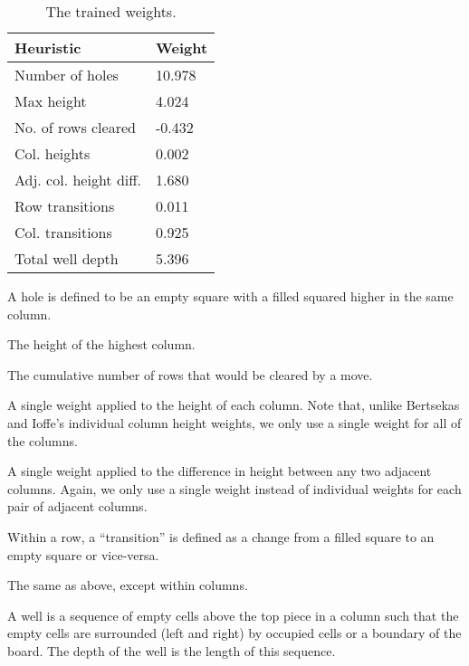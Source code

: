 \documentclass[12pt, twocolumn]{article}
\begin{document}
\begin{table}
\centering
\begin{tabular}{ l l }
\toprule
Heuristic & Weight \\
\midrule
Number of holes & 10.978 \\
Max height & 4.024 \\ 
No. of rows cleared & -0.432 \\
Col. heights & 0.002 \\ 
Adj. col. height diff. & 1.680 \\ 
Row transitions & 0.011 \\ 
Col. transitions & 0.925 \\ 
Total well depth & 5.396 \\  
\bottomrule
\end{tabular}
\caption{The trained weights.}
\label{tbl:heu}
\end{table}

\begin{description}[leftmargin=0.5cm]
	\item[Number of holes.]
	A hole is defined to be an empty square with a filled
	squared higher in the same column.\footnotemark[1]
    
    \item[Maximum height.]
	The height of the highest column.\footnotemark[1]
    
    \item[Rows cleared.]
	The cumulative number of rows that would be cleared by a move.\footnotemark[2]
    
    \item[Column heights.]
	A single weight applied to the height of each column. 
    Note that, unlike Bertsekas and Ioffe's individual column 
    height weights, we only use a single weight for all
    of the columns.\footnotemark[1]
    
    \item[Adjacent column height differences.]
	A single weight applied to the difference in height
	between any two adjacent columns. Again, we only use
    a single weight instead of individual weights for each pair
    of adjacent columns.\footnotemark[1]
    
    \item[Row transitions.]
	Within a row, a ``transition'' is defined as a change
	from a filled square to an empty square or vice-versa.\footnotemark[2]
    
    \item[Column transitions.]
	The same as above, except within columns.\footnotemark[2]
    
    \item[Total depth of all wells.]
	A well is a sequence of empty cells above the top
	piece in a column such that the empty cells are
 	surrounded (left and right) by occupied cells or a
	boundary of the board. The depth of the well is the
    length of this sequence.\footnotemark[2]
    
\end{description}
\end{document}
